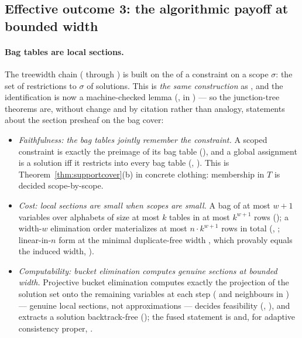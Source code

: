 \documentclass[11pt]{article}
\begin{document}
\subsection{Effective outcome 3: the algorithmic payoff at bounded
width}
\label{sec:algorithms-sub}

\paragraph{Bag tables are local sections.}  The treewidth chain
( through ) is built on
the  of a constraint on a scope $\sigma$: the set of
restrictions to $\sigma$ of solutions.  This is \emph{the same
construction} as , and the identification is now
a machine-checked lemma (, in
) --- so the junction-tree theorems are,
without change and by citation rather than analogy, statements about
the section presheaf on the bag cover:

\begin{itemize}
\item \emph{Faithfulness: the bag tables jointly remember the
  constraint.}  A scoped constraint is exactly the preimage of its
  bag table (), and a global
  assignment is a solution iff it restricts into every bag table
  (,
  ).  This is
  Theorem~\ref{thm:supportcover}(b) in concrete clothing: membership
  in $T$ is decided scope-by-scope.
\item \emph{Cost: local sections are small when scopes are small.}  A
  bag of at most $w+1$ variables over alphabets of size at most $k$
  tables in at most $k^{w+1}$ rows (); a
  width-$w$ elimination order materializes at most $n \cdot k^{w+1}$
  rows in total (,
  ; linear-in-$n$ form
   at the minimal duplicate-free
  width , which provably equals the induced
  width, ).
\item \emph{Computability: bucket elimination computes genuine
  sections at bounded width.}  Projective bucket elimination computes
  exactly the projection of the solution set onto the remaining
  variables at each step
  ( and neighbours in
  ) --- genuine local sections, not
  approximations --- decides feasibility
  (,
  ), and extracts a solution
  backtrack-free
  (); the fused
  statement is  and, for
  adaptive consistency proper, 
  \citep{dechter1999bucket,dechter2003constraint,dechterpearl1987network}.
\end{itemize}
\end{document}
